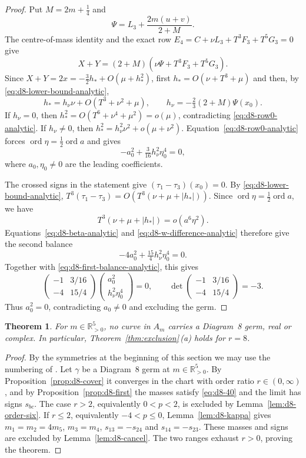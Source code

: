 \documentclass[Threeside,11pt]{article}
\newtheorem{theorem}{Theorem}[section]
\theoremstyle{definition}
\theoremstyle{remark}
\numberwithin{equation}{section}
\theoremstyle{remark}
\newcommand{\Rp}{\mathbb{R}_{>0}}
\newcommand{\ord}{\operatorname{ord}}
\begin{document}
{\begin{proof}
Put $M=2m+\tfrac14$ and
\[
\Psi=L_3+\frac{2m(u+v)}{2+M}.
\]
The centre-of-mass identity and the exact row
$E_4=C+\nu L_3+T^3F_3+T^5G_3=0$ give
\[
X+Y=(2+M)(\nu\Psi+T^3F_3+T^5G_3).
\]
Since $X+Y=2x=-\tfrac32h_*+O(\mu+h_*^2)$, first
$h_*=O(\nu+T^3+\mu)$ and then, by
\eqref{eq:d8-lower-bound-analytic},
\[
h_*=h_\nu\nu+O(T^3+\nu^2+\mu),\qquad
h_\nu=-\tfrac23(2+M)\Psi(x_0).
\]
If $h_\nu=0$, then
$h_*^2=O(T^6+\nu^4+\mu^2)=o(\mu)$, contradicting
\eqref{eq:d8-row0-analytic}.
If $h_\nu\ne0$, then
$h_*^2=h_\nu^2\nu^2+o(\mu+\nu^2)$.
Equation~\eqref{eq:d8-row0-analytic} forces
$\operatorname{ord}\eta=\tfrac12\operatorname{ord}a$ and gives
\begin{equation}\label{eq:d8-first-balance-analytic}
-a_0^2+\tfrac3{16}h_\nu^2\eta_0^4=0,
\end{equation}
where $a_0,\eta_0\ne0$ are the leading coefficients.

The crossed signs in the statement give $(\tau_1-\tau_3)(x_0)=0$.
By \eqref{eq:d8-lower-bound-analytic},
$T^3(\tau_1-\tau_3)=O(T^3(\nu+\mu+|h_*|))$.
Since $\ord\eta=\tfrac12\ord a$, we have
\[
 T^3(\nu+\mu+|h_*|)=o(a^6\eta^2).
\]
Equations~\eqref{eq:d8-beta-analytic} and
\eqref{eq:d8-w-difference-analytic} therefore give the second balance
\[
-4a_0^2+\tfrac{15}{4}h_\nu^2\eta_0^4=0.
\]
Together with \eqref{eq:d8-first-balance-analytic}, this gives
\[
\begin{pmatrix}
-1&3/16\\
-4&15/4
\end{pmatrix}
\begin{pmatrix}a_0^2\\ h_\nu^2\eta_0^4\end{pmatrix}=0,
\qquad
\det\begin{pmatrix}-1&3/16\\-4&15/4\end{pmatrix}=-3.
\]
Thus $a_0^2=0$, contradicting $a_0\ne0$ and excluding the germ.
\end{proof}

}\begin{theorem}\label{thm:d8}
For $m\in\Rp^5$, no curve in $A_m$ carries a Diagram~8 germ, real or complex.
In particular, Theorem~\ref{thm:exclusion}\,(a) holds for $r=8$.
\end{theorem}

\begin{proof}
By the symmetries at the beginning of this section we may use the numbering of
\cite[\S8.8]{AK}.  Let $\gamma$ be a Diagram~8 germ at $m\in\Rp^5$.  By
Proposition~\ref{prop:d8-cover} it converges in the chart with order ratio
$r\in(0,\infty)$, and by
Proposition~\ref{prop:d8-first} the masses satisfy \eqref{eq:d8-40} and the limit has signs
$s_{bc}$.  The case $r>2$, equivalently $0<p<2$, is excluded by
Lemma~\ref{lem:d8-order-six}.  If $r\le2$, equivalently $-4<p\le0$,
Lemma~\ref{lem:d8-kappa} gives $m_1=m_2=4m_5$, $m_3=m_4$, $s_{13}=-s_{24}$
and $s_{14}=-s_{23}$.  These masses and signs are excluded by
Lemma~\ref{lem:d8-cancel}.  The two ranges exhaust $r>0$, proving the theorem.
\end{proof}
\end{document}

